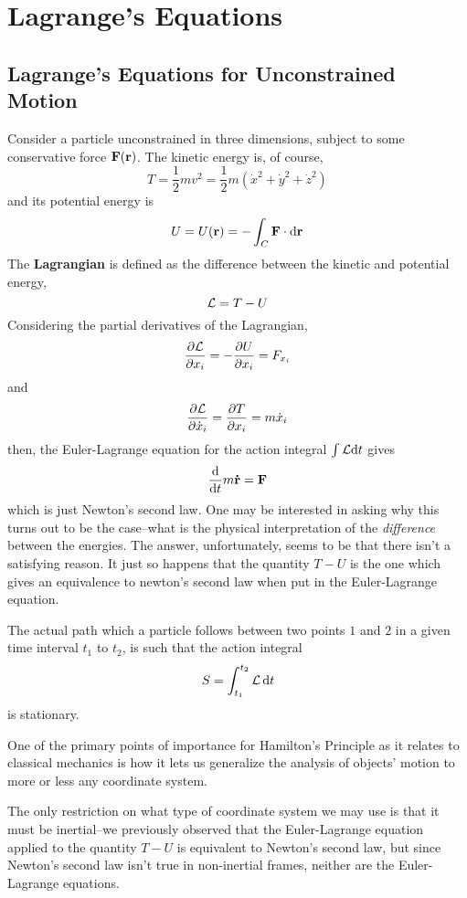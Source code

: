 \chapter{Lagrange's Equations}
\section{Lagrange's Equations for Unconstrained Motion}
Consider a particle unconstrained in three dimensions, subject to some conservative force $\mathbf{F}(\mathbf{r})$. The kinetic energy is, of course,
\[ T = \frac{1}{2}mv^2 = \frac{1}{2}m (\dot x^2 + \dot y^2 + \dot z^2) \]
and its potential energy is
\[ U = U(\mathbf{r}) = -\int_C \mathbf{F} \cdot \dd \mathbf{r} \]
The \textbf{Lagrangian} is defined as the difference between the kinetic and potential energy,
\[ \mathcal{L} = T - U \]
Considering the partial derivatives of the Lagrangian,
\begin{align*}
    \pdv{\mathcal{L}}{x_i} = -\pdv{U}{x_i} = F_{x_i}
\end{align*}
and
\begin{align*}
    \pdv{\mathcal{L}}{\dot x_i} = \pdv{T}{x_i} = m\dot x_i
\end{align*}
then, the Euler-Lagrange equation for the action integral $\int \mathcal{L} \dd t$ gives
\[ \dv{t} m\mathbf{\dot r} = \mathbf{F}\]
which is just Newton's second law. One may be interested in asking why this turns out to be the case--what is the physical interpretation of the \textit{difference} between the energies. The answer, unfortunately, seems to be that there isn't a satisfying reason. It just so happens that the quantity $T-U$ is the one which gives an equivalence to newton's second law when put in the Euler-Lagrange equation. 
\begin{theorem}
    The actual path which a particle follows between two points $1$ and $2$ in a given time interval $t_1$ to $t_2$, is such that the action integral
    \[ S = \int_{t_1}^{t_2} \mathcal{L}\, \dd t \]
    is stationary. 
\end{theorem}
One of the primary points of importance for Hamilton's Principle as it relates to classical mechanics is how it lets us generalize the analysis of objects' motion to more or less any coordinate system.

The only restriction on what type of coordinate system we may use is that it must be inertial--we previously observed that the Euler-Lagrange equation applied to the quantity $T-U$ is equivalent to Newton's second law, but since Newton's second law isn't true in non-inertial frames, neither are the Euler-Lagrange equations. 


